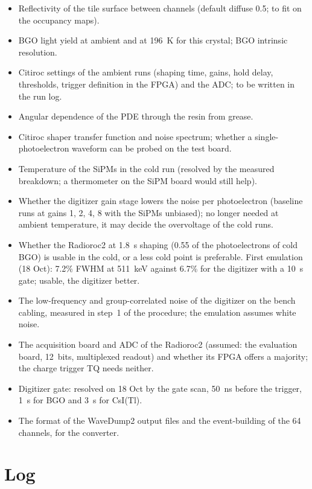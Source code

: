 \documentclass[11pt]{article}
\newcommand{\us}{\textmu s\xspace}
\newcommand{\csitl}{CsI(Tl)\xspace}
\begin{document}
\begin{itemize}
\item Reflectivity of the tile surface between channels (default diffuse 0.5;
  to fit on the occupancy maps).
\item BGO light yield at ambient and at 196~K for this crystal; BGO intrinsic
  resolution.
\item Citiroc settings of the ambient runs (shaping time, gains, hold delay,
  thresholds, trigger definition in the FPGA) and the ADC; to be written in
  the run log.
\item Angular dependence of the PDE through the resin from grease.
\item Citiroc shaper transfer function and noise spectrum; whether a
  single-photoelectron waveform can be probed on the test board.
\item Temperature of the SiPMs in the cold run (resolved by the measured
  breakdown; a thermometer on the SiPM board would still help).
\item Whether the digitizer gain stage lowers the noise per photoelectron
  (baseline runs at gains 1, 2, 4, 8 with the SiPMs unbiased); no longer
  needed at ambient temperature, it may decide the overvoltage of the cold
  runs.
\item Whether the Radioroc2 at 1.8~\us shaping (0.55 of the photoelectrons
  of cold BGO) is usable in the cold, or a less cold point is preferable.
  First emulation (18 Oct): 7.2\% FWHM at 511~keV against 6.7\% for the
  digitizer with a 10~\us gate; usable, the digitizer better.
\item The low-frequency and group-correlated noise of the digitizer on the
  bench cabling, measured in step~1 of the procedure; the emulation assumes
  white noise.
\item The acquisition board and ADC of the Radioroc2 (assumed: the
  evaluation board, 12~bits, multiplexed readout) and whether its FPGA
  offers a majority; the charge trigger TQ needs neither.
\item Digitizer gate: resolved on 18 Oct by the gate scan, 50~ns before
  the trigger, 1~\us for BGO and 3~\us for \csitl.
\item The format of the WaveDump2 output files and the event-building of the
  64 channels, for the converter.
\end{itemize}

\section{Log}
\end{document}
